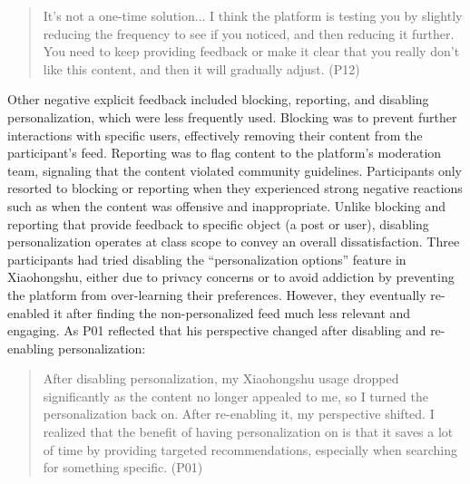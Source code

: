 \begin{quote}
    It's not a one-time solution... I think the platform is testing you by slightly reducing the frequency to see if you noticed, and then reducing it further. You need to keep providing feedback or make it clear that you really don't like this content, and then it will gradually adjust. (P12)
\end{quote}
Other negative explicit feedback included blocking, reporting, and disabling personalization, which were less frequently used. Blocking was to prevent further interactions with specific users, effectively removing their content from the participant's feed. Reporting was to flag content to the platform's moderation team, signaling that the content violated community guidelines. Participants only resorted to blocking or reporting when they experienced strong negative reactions such as when the content was offensive and inappropriate. Unlike blocking and reporting that provide feedback to specific object (a post or user), disabling personalization operates at class scope to convey an overall dissatisfaction. Three participants had tried disabling the ``personalization options'' feature in Xiaohongshu, either due to privacy concerns or to avoid addiction by preventing the platform from over-learning their preferences. However, they eventually re-enabled it after finding the non-personalized feed much less relevant and engaging. As P01 reflected that his perspective changed after disabling and re-enabling personalization: 
\begin{quote}
    After disabling personalization, my Xiaohongshu usage dropped significantly as the content no longer appealed to me, so I turned the personalization back on. After re-enabling it, my perspective shifted. I realized that the benefit of having personalization on is that it saves a lot of time by providing targeted recommendations, especially when searching for something specific. (P01)
\end{quote}
